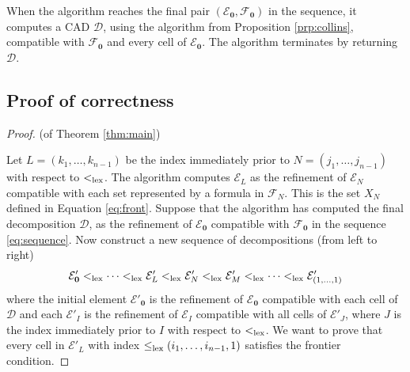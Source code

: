\documentclass[
]{book}
\theoremstyle{definition}
\theoremstyle{definition}
\theoremstyle{definition}
\theoremstyle{definition}
\theoremstyle{remark}
\begin{document}
When the algorithm reaches the final pair \(({\mathcal E}_{\mathbf{0}}, \mathcal{F}_{\mathbf{0}})\) in the sequence,
it computes a CAD \(\mathcal D\), using the algorithm from Proposition \ref{prp:collins}, compatible
with \(\mathcal{F}_{\mathbf{0}}\) and every cell of \({\mathcal E}_{\mathbf{0}}\). The algorithm terminates by returning \(\mathcal D\).

\hypertarget{proof-of-correctness}{%
\subsection{Proof of correctness}\label{proof-of-correctness}}

\begin{proof}
(of Theorem \ref{thm:main})

Let \(L=(k_1, \ldots ,k_{n-1})\) be the index immediately prior to \(N=(j_1, \ldots ,j_{n-1} )\) with respect to \(<_{\rm{lex}}\).
The algorithm computes \({\mathcal E}_L\) as the refinement of \({\mathcal E}_N\) compatible with each set represented by a formula in \(\mathcal{F}_N\). This is the set \(X_N\) defined in Equation \eqref{eq:front}.
Suppose that the algorithm has computed the final decomposition \(\mathcal{D}\), as the refinement of \(\mathcal{E}_{\mathbf{0}}\) compatible with \(\mathcal{F}_{\mathbf{0}}\) in the sequence \ref{eq:sequence}. Now construct a new sequence of decompositions (from left to right)
\begin{equation}
\mathcal{E}'_{\mathbf{0}} <_{\rm{lex}}\cdots <_{\rm{lex}}\mathcal{E}'_L <_{\rm{lex}}\mathcal{E}'_N <_{\rm{lex}}\mathcal{E}'_M <_{\rm{lex}}\cdots <_{\rm{lex}}\mathcal{E}'_{(1,\ldots,1)}
\label{eq:seq-ind-hyp}
\end{equation}
where the initial element \(\mathcal{E}'_{\mathbf{0}}\) is the refinement of \(\mathcal{E}_{\mathbf{0}}\) compatible with each cell of \(\mathcal{D}\) and each \(\mathcal{E}'_I\) is the refinement of \(\mathcal{E}_I\) compatible with all cells of \(\mathcal{E}'_J\), where \(J\) is the index immediately prior to \(I\) with respect to \(<_{\rm{lex}}\).
We want to prove that every cell in \(\mathcal{E}'_L\) with index \(\le_{\rm{lex}}(i_1,\ldots,i_{n-1},1)\) satisfies the frontier condition.


\end{proof}
\end{document}
